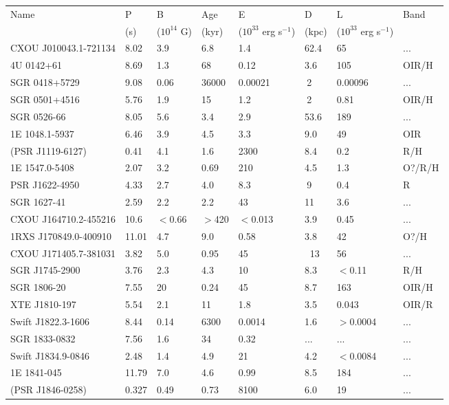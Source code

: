 \documentclass{standalone}
\begin{document}
	
\begin{tabular}{l|l|l|l|l|l|l|l}
Name & P & B & Age & E & D & L &  Band \\
	 & (s) & ($10^{14}$ G) & (kyr) & ($10^{33}$ erg s$^{-1}$) & (kpc) & ($10^{33}$ erg s$^{-1}$) & \\
\hline
CXOU J010043.1-721134 	& 8.02 	& 3.9	& 6.8 	& 1.4 		& 62.4 	& 65 		& ...\\
4U 0142+61 				& 8.69 	& 1.3	& 68 	& 0.12		& 3.6	& 105 		& OIR/H\\
SGR 0418+5729 			& 9.08 	& 0.06	& 36000	& 0.00021	& $~$2	& 0.00096	& ...\\
SGR 0501+4516 			& 5.76 	& 1.9	& 15 	& 1.2		& $~$2	& 0.81		& OIR/H\\
SGR 0526-66 			& 8.05 	& 5.6	& 3.4 	& 2.9 		&53.6	& 189		& ...\\
1E 1048.1-5937 			& 6.46 	& 3.9	& 4.5	& 3.3 		&9.0	& 49		& OIR\\
(PSR J1119-6127) 		& 0.41 	& 4.1	& 1.6	& 2300		& 8.4	& 0.2		& R/H\\
1E 1547.0-5408  		& 2.07 	& 3.2	& 0.69	& 210		& 4.5	& 1.3		& O?/R/H\\
PSR J1622-4950 			& 4.33 	& 2.7	& 4.0	& 8.3		& $~$9	& 0.4		& R\\
SGR 1627-41 			& 2.59 	& 2.2	& 2.2	& 43 		&11		& 3.6		& ...\\
CXOU J164710.2-455216 	& 10.6 	& $<$0.66	& $>$420	& $<$0.013	& 3.9	& 0.45		& ...\\
1RXS J170849.0-400910 	& 11.01	& 4.7	& 9.0	& 0.58		& 3.8 	&42 		& O?/H\\
CXOU J171405.7-381031 	& 3.82 	& 5.0 	& 0.95	& 45		& $~$ 13  & 56 		&...\\
SGR J1745-2900 			& 3.76 	& 2.3	& 4.3	& 10		& 8.3	& $<$0.11		& R/H\\
SGR 1806-20 			& 7.55 	& 20	& 0.24 	& 45		& 8.7	& 163		& OIR/H\\
XTE J1810-197 			& 5.54 	& 2.1	& 11	& 1.8		& 3.5	& 0.043		& OIR/R\\
Swift J1822.3-1606 		& 8.44 	& 0.14	& 6300	& 0.0014	& 1.6	& $>$0.0004	& ...\\
SGR 1833-0832 			& 7.56 	& 1.6 	& 34	& 0.32		& ... 	&...		& ...\\
Swift J1834.9-0846 		& 2.48 	& 1.4	& 4.9	& 21		& 4.2	& $<$0.0084	& ...\\
1E 1841-045 			& 11.79	& 7.0 	& 4.6 	& 0.99 		& 8.5	& 184 		&...\\
(PSR J1846-0258) 		& 0.327	& 0.49	& 0.73	& 8100 		&6.0	& 19		& ...\\

\end{tabular}
\end{document}
